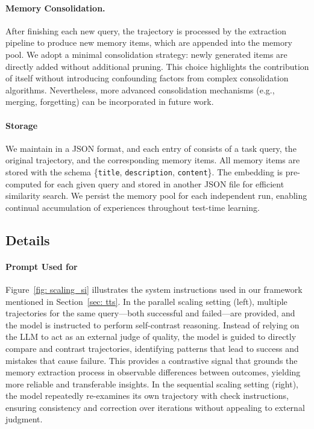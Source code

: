 \paragraph{Memory Consolidation.}

After finishing each new query, the trajectory is processed by the extraction pipeline to produce new memory items, which are appended into the memory pool. 
We adopt a minimal consolidation strategy: newly generated items are directly added without additional pruning.
This choice highlights the contribution of \ours{} itself without introducing confounding factors from complex consolidation algorithms. 
Nevertheless, more advanced consolidation mechanisms (e.g., merging, forgetting) can be incorporated in future work. 


\paragraph{\ours{} Storage}
We maintain \ours{} in a JSON format, and each entry of \ours{} consists of a task query, the original trajectory, and the corresponding memory items.
All memory items are stored with the schema \{\texttt{title}, \texttt{description}, \texttt{content}\}.
The embedding is pre-computed for each given query and stored in another JSON file for efficient similarity search. 
We persist the memory pool for each independent run, enabling continual accumulation of experiences throughout test-time learning. 



\subsection{\mats{} Details}\label{app: prompt_mats}

\paragraph{Prompt Used for \mats{}} Figure~\ref{fig: scaling_si} illustrates the system instructions used in our \mats{} framework mentioned in Section~\ref{sec: tts}. In the parallel scaling setting (left), multiple trajectories for the same query—both successful and failed—are provided, and the model is instructed to perform self-contrast reasoning. Instead of relying on the LLM to act as an external judge of quality, the model is guided to directly compare and contrast trajectories, identifying patterns that lead to success and mistakes that cause failure. This provides a contrastive signal that grounds the memory extraction process in observable differences between outcomes, yielding more reliable and transferable insights. In the sequential scaling setting (right), the model repeatedly re-examines its own trajectory with check instructions, ensuring consistency and correction over iterations without appealing to external judgment.


